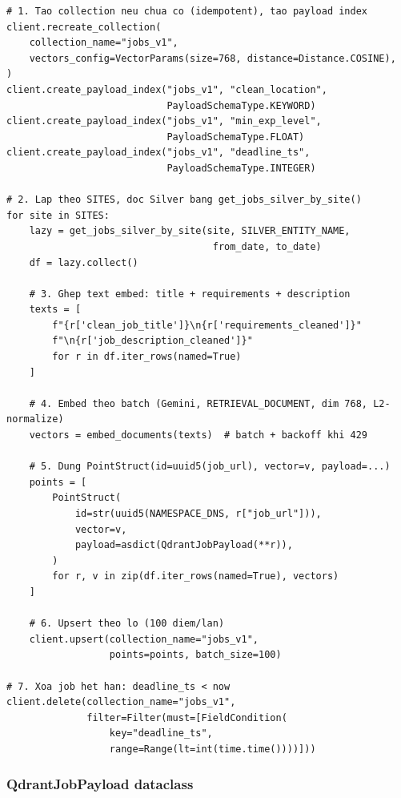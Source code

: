 \begin{lstlisting}[caption={\texttt{src/storage\_layer/Qdrant/scripts/index\_silver\_to\_qdrant.py} --- luồng indexing (trích đoạn)}, label={lst:qdrant-index}]
# 1. Tao collection neu chua co (idempotent), tao payload index
client.recreate_collection(
    collection_name="jobs_v1",
    vectors_config=VectorParams(size=768, distance=Distance.COSINE),
)
client.create_payload_index("jobs_v1", "clean_location",
                            PayloadSchemaType.KEYWORD)
client.create_payload_index("jobs_v1", "min_exp_level",
                            PayloadSchemaType.FLOAT)
client.create_payload_index("jobs_v1", "deadline_ts",
                            PayloadSchemaType.INTEGER)

# 2. Lap theo SITES, doc Silver bang get_jobs_silver_by_site()
for site in SITES:
    lazy = get_jobs_silver_by_site(site, SILVER_ENTITY_NAME,
                                    from_date, to_date)
    df = lazy.collect()

    # 3. Ghep text embed: title + requirements + description
    texts = [
        f"{r['clean_job_title']}\n{r['requirements_cleaned']}"
        f"\n{r['job_description_cleaned']}"
        for r in df.iter_rows(named=True)
    ]

    # 4. Embed theo batch (Gemini, RETRIEVAL_DOCUMENT, dim 768, L2-normalize)
    vectors = embed_documents(texts)  # batch + backoff khi 429

    # 5. Dung PointStruct(id=uuid5(job_url), vector=v, payload=...)
    points = [
        PointStruct(
            id=str(uuid5(NAMESPACE_DNS, r["job_url"])),
            vector=v,
            payload=asdict(QdrantJobPayload(**r)),
        )
        for r, v in zip(df.iter_rows(named=True), vectors)
    ]

    # 6. Upsert theo lo (100 diem/lan)
    client.upsert(collection_name="jobs_v1",
                  points=points, batch_size=100)

# 7. Xoa job het han: deadline_ts < now
client.delete(collection_name="jobs_v1",
              filter=Filter(must=[FieldCondition(
                  key="deadline_ts",
                  range=Range(lt=int(time.time())))]))
\end{lstlisting}

\subsubsection{QdrantJobPayload dataclass}
\label{subsubsec:qdrant-payload}

